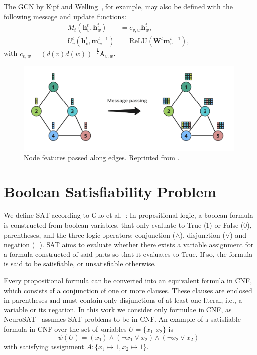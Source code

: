 The \ac{GCN} by Kipf and Welling~\cite{kipf2016semi}, for example, may also be defined with the following message and update functions:
\begin{align}
    M_t(\mathbf{h}_v^t, \mathbf{h}_w^t) &= c_{v,w}\mathbf{h}_w^t, \\
    U_v^t(\mathbf{h}_v^t, \mathbf{m}_w^{t+1}) &= \text{ReLU}(\mathbf{W}^t\mathbf{m}_v^{t+1}),
\end{align}
with $c_{v,w} = (d(v)d(w))^{-\frac{1}{2}}\mathbf{A}_{v,w}$.

\begin{figure}
    \includegraphics[width=\textwidth]{img/message_passing.png}
    \caption[Message passing]{Node features passed along edges. Reprinted from \cite{ali2023gnns}.}
    \label{fig:message_passing}
\end{figure}


\section{Boolean Satisfiability Problem}
\label{sec:SAT}
We define SAT according to Guo et al.~\cite{guo2023machine}: In propositional logic, a boolean formula is constructed from boolean variables, that only evaluate to True (1) or False (0), parentheses, and the three logic operators: conjunction ($\wedge$), disjunction ($\vee$) and negation ($\neg$). SAT aims to evaluate whether there exists a variable assignment for a formula constructed of said parts so that it evaluates to True. If so, the formula is said to be satisfiable, or unsatisfiable otherwise. 

Every propositional formula can be converted into an equivalent formula in \ac{CNF}, which consists of a conjunction of one or more clauses. These clauses are enclosed in parentheses and must contain only disjunctions of at least one literal, i.e., a variable or its negation. In this work we consider only formulae in CNF, as NeuroSAT~\cite{selsam2018learning} assumes SAT problems to be in CNF. An example of a satisfiable formula in CNF over the set of variables $U=\{x_1,x_2\}$ is 
$$\psi(U) = (x_1) \land (\neg x_1 \lor x_2) \land (\neg x_2 \lor x_2)$$
with satisfying assignment $A:\{x_1 \mapsto 1, x_2 \mapsto 1\}$. 

